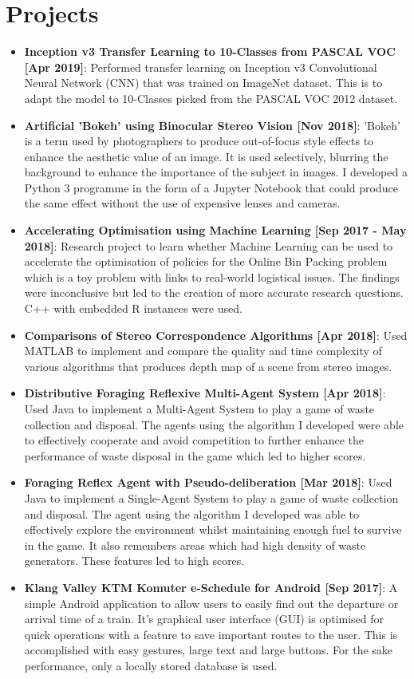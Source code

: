 \documentclass[letterpaper,11pt]{article}
\newcommand{\resumeItem}[2]{
  \item\small{
    \textbf{#1}{: #2 \vspace{-2pt}}
  }
}
\newcommand{\resumeSubItem}[2]{\resumeItem{#1}{#2}\vspace{-4pt}}
\newcommand{\resumeSubHeadingListStart}{\begin{itemize}[leftmargin=*]}
\newcommand{\resumeSubHeadingListEnd}{\end{itemize}}
\begin{document}
\section{Projects}
  \resumeSubHeadingListStart
    \resumeSubItem{Inception v3 Transfer Learning to 10-Classes from PASCAL VOC [Apr 2019]}
      {Performed transfer learning on Inception v3 Convolutional Neural Network (CNN) that was trained on ImageNet dataset. This is to adapt the model to 10-Classes picked from the PASCAL VOC 2012 dataset.}
    \resumeSubItem{Artificial 'Bokeh' using Binocular Stereo Vision [Nov 2018]}
      {'Bokeh' is a term used by photographers to produce out-of-focus style effects to enhance the aesthetic value of an image. It is used selectively, blurring the background to enhance the importance of the subject in images. I developed a Python 3 programme in the form of a Jupyter Notebook that could produce the same effect without the use of expensive lenses and cameras.}
     \resumeSubItem{Accelerating Optimisation using Machine Learning [Sep 2017 - May 2018]}
      {Research project to learn whether Machine Learning can be used to accelerate the optimisation of policies for the Online Bin Packing problem which is a toy problem with links to real-world logistical issues. The findings were inconclusive but led to the creation of more accurate research questions. C++ with embedded R instances were used.}
     \resumeSubItem{Comparisons of Stereo Correspondence Algorithms [Apr 2018]}
      {Used MATLAB to implement and compare the quality and time complexity of various algorithms that produces depth map of a scene from stereo images.}
    \resumeSubItem{Distributive Foraging Reflexive Multi-Agent System [Apr 2018]}
      {Used Java to implement a Multi-Agent System to play a game of waste collection and disposal. The agents using the algorithm I developed were able to effectively cooperate and avoid competition to further enhance the performance of waste disposal in the game which led to higher scores.}
    \resumeSubItem{Foraging Reflex Agent with Pseudo-deliberation [Mar 2018]}
      {Used Java to implement a Single-Agent System to play a game of waste collection and disposal. The agent using the algorithm I developed was able to effectively explore the environment whilst maintaining enough fuel to survive in the game. It also remembers areas which had high density of waste generators. These features led to high scores.}
    \resumeSubItem{Klang Valley KTM Komuter e-Schedule for Android [Sep 2017]}
      {A simple Android application to allow users to easily find out the departure or arrival time of a train. It's graphical user interface (GUI) is optimised for quick operations with a feature to save important routes to the user. This is accomplished with easy gestures, large text and large buttons. For the sake performance, only a locally stored database is used.}
  \resumeSubHeadingListEnd
\end{document}
